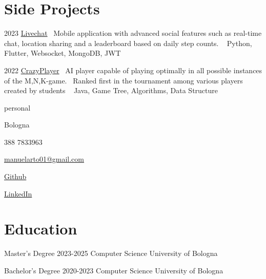 \documentclass{tccv}
\begin{document}
\section{Side Projects}

\begin{yearlist}

\item{2023}
     {\href{https://github.com/manuelarto/livechat}{Livechat}}
     {\textbullet~Mobile application with advanced social features such as real-time chat, location sharing and a leaderboard based on daily step counts. \newline
    \textbullet~ Python, Flutter, Websocket, MongoDB, JWT}
\item{2022}
     {\href{https://github.com/manuelarto/crazyplayer}{CrazyPlayer}}
     {\textbullet~AI player capable of playing optimally in all possible instances of the M,N,K-game. \newline
     \textbullet~Ranked first in the tournament among various players created by students \newline
    \textbullet~ Java, Game Tree, Algorithms, Data Structure}

\end{yearlist}


\newpage


\begin{keyvaluelist}{personal}
    \item[\faHome] Bologna
    \item[\faPhone] 388 7833963
    \item[\faEnvelope] \href{mailto:my@email.address}{manuelarto01@gmail.com}
    \item[\faGithub] \href{https://github.com/manuelarto}{Github}
    \item[\faLinkedin] \href{https://www.linkedin.com/in/manuel-arto-696012203/}{LinkedIn}
\end{keyvaluelist}


\section{Education}

\begin{yearlist}

\item[Master's Degree]{2023-2025}
     {Computer Science}
     {University of Bologna}

\item[Bachelor's Degree]{2020-2023}
    {Computer Science}
    {University of Bologna}

\end{yearlist}
\end{document}
